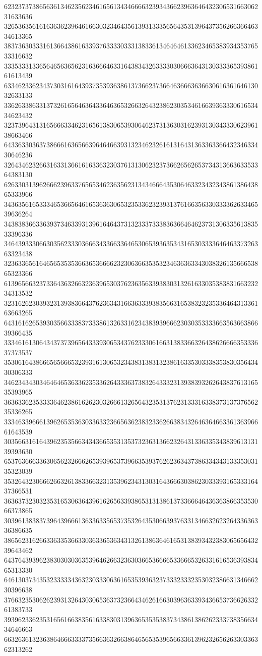 62323737386563613462356234616561343466663239343662396364643230653166306231633636
32653635616163636239646166303234643561393133356564353139643735626636646334613365
38373630333161366438616339376333303331383361346464613362346538393435376533316632
33353331336564656365623163666463316438343263333030666364313033336539386161613439
63346233623437303161643937353936386137366237366463666363663061636164613032633133
33626338633137326165646364336463653266326432386230353461663936333061653434623432
32373964313165666334623165613830653930646237313630316239313034333062396138663466
64336330363738666163656639646466393132346232616131643136336336643234633430646236
32643462326631633136616163363230376131306232373662656265373431366363353364383130
62633031396266623963376565346236356231343466643530646332343234386138643865333966
34363561653334653665646165363630653235336232393137616635633033336263346539636264
34383836633639373463393139616464373132333733383636646462373130633561383533396336
34643933306630356233303666343366336465306539363534316530333364646337326363323438
32363365616465653535366365366662323063663535323463636334303832613566653865323366
61396566323733643632663236396530376236356339383031326163303538383166323234313532
32316262303932313938366437623634316636333938356631653832323533646431336163663265
64316162653930356633383733386132633162343839396662303035333366356366386639366435
33346161306434373739656433393065343762333061663138336632643862666635333637373537
35306164386665656665323931613065323438313831323861633530333835383035643430306333
34623434303464646536336235336264333637383264333231393839326264383761316535393965
36363362353333646238616262303266613265643235313762313331633837313737656235336265
33346339666139626535363033633236656362383233626638343264636466336136396661643539
30356631616439623535663434366535313537323631366232643133633534383961313139393630
65376366633630656232666265393965373966353937626236343738633434313335303135323039
35326432306662663261383366323135396234313031643666303862303339316533316437366531
36363732303235316530636439616265633938653131386137336664643636386635353066373865
30396138383739643966613633633565373532643530663937633134663262326433636336386635
38656231626633633536633036336536343132613863646165313839343238306565643239643462
64376439396238303030363539646266323630366536666533666532633161653639383465313330
64613037343532333334363230333063616535393632373332333235303238663134666230396638
37663235306262393132643030653637323664346261663039636339343665373662633261383733
39396233623531656166383561633830313963653535383734386138626233373835663434646663
66326361323638646663333735663632663864656535396566336139623265626330336362313262
